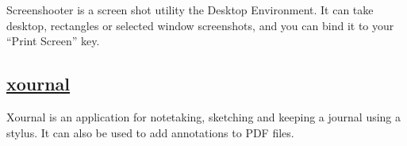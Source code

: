  Screenshooter is a screen shot utility the Desktop Environment. It can take
 desktop, rectangles or selected window screenshots, and you can bind it to
 your ``Print Screen'' key.

\subsection{\href{http://xournal.sourceforge.net/}{xournal}}

 Xournal is an application for notetaking, sketching and
 keeping a journal using a stylus. It can also be used to
 add annotations to PDF files.

